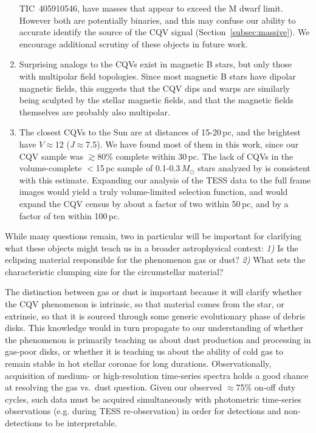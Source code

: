 \documentclass[11pt,twocolumn,tighten]{aastex63}
\begin{document}
\begin{enumerate}[leftmargin=*]
      TIC~405910546, have masses that appear to exceed the M dwarf
      limit.  However both are potentially binaries, and this may
      confuse our ability to accurate identify the source of the CQV
      signal (Section~\ref{subsec:massive}).  We encourage additional
      scrutiny of these objects in future work.
    \item Surprising analogs to the CQVs exist in magnetic B stars,
      but only those with multipolar field topologies.  Since most
      magnetic B stars have dipolar magnetic fields, this suggests
      that the CQV dips and warps are similarly being sculpted by the
      stellar magnetic fields, and that the magnetic fields themselves
      are probably also multipolar.
    \item The closest CQVs to the Sun are at distances of 15-20\,pc,
      and the brightest have $V$$\approx$12 ($J$$\approx$7.5).  We
      have found most of them in this work, since our CQV sample was
      $\gtrsim$80\% complete within 30\,pc.  The lack of CQVs in the
      volume-complete $<$15\,pc sample of 0.1-0.3\,$M_\odot$ stars
      analyzed by \citet{2021AJ....161...63W} is consistent with this
      estimate.  Expanding our analysis of the TESS data to the full
      frame images would yield a truly volume-limited selection
      function, and would expand the CQV census by about a factor of
      two within 50\,pc, and by a factor of ten within 100\,pc.
\end{enumerate}

While many questions remain, two in particular will be important for
clarifying what these objects might teach us in a broader
astrophysical context: {\it 1)} Is the eclipsing material responsible
for the phenomenon gas or dust?  {\it 2)} What sets the characteristic
clumping size for the circumstellar material?

The distinction between gas or dust is important because it will
clarify whether the CQV phenomenon is intrinsic, so that material
comes from the star, or extrinsic, so that it is sourced through some
generic evolutionary phase of debris disks.  This knowledge would in
turn propagate to our understanding of whether the phenomenon is
primarily teaching us about dust production and processing in gas-poor
disks, or whether it is teaching us about the ability of cold gas to
remain stable in hot stellar coronae for long durations.
Observationally, acquisition of medium- or high-resolution time-series
spectra holds a good chance at resolving the gas vs.~dust question.
Given our observed $\approx$75\% on-off duty cycles, such data must be
acquired simultaneously with photometric time-series observations
(e.g. during TESS re-observation) in order for detections and
non-detections to be interpretable.
\end{document}
